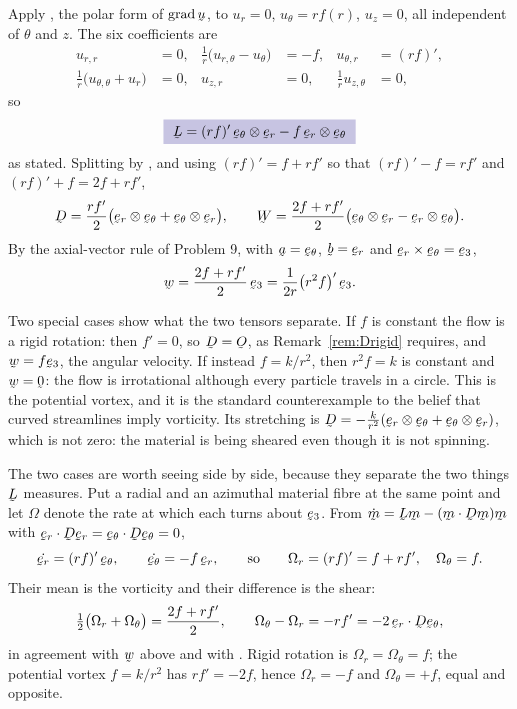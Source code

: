 \begin{solution}
Apply , the polar form of $\grad\bu$, to
$u_{r}=0$, $u_{\theta}=rf(r)$, $u_{z}=0$, all independent of $\theta$ and
$z$. The six coefficients are
\[
\begin{aligned}
   u_{r,r}&=0, &\tfrac1r\big(u_{r,\theta}-u_{\theta}\big)&=-f,
   &u_{\theta,r}&=(rf)',\\
   \tfrac1r\big(u_{\theta,\theta}+u_{r}\big)&=0,
   &u_{z,r}&=0, &\tfrac1r u_{z,\theta}&=0,
\end{aligned}
\]
so
\[
   \boxed{\ \bL=(rf)'\,\bet\otimes\ber-f\,\ber\otimes\bet\ }
\]
as stated. Splitting by , and using $(rf)'=f+rf'$ so that
$(rf)'-f=rf'$ and $(rf)'+f=2f+rf'$,
\[
   \bD=\frac{rf'}{2}\big(\ber\otimes\bet+\bet\otimes\ber\big),
   \qquad
   \bW=\frac{2f+rf'}{2}\big(\bet\otimes\ber-\ber\otimes\bet\big).
\]
By the axial-vector rule of Problem 9, with $\ba=\bet$, $\bb=\ber$ and
$\ber\times\bet=\be_{3}$,
\[
   \bw=\frac{2f+rf'}{2}\,\be_{3}=\frac{1}{2r}\big(r^{2}f\big)'\,\be_{3}.
\]

Two special cases show what the two tensors separate. If $f$ is constant
the flow is a rigid rotation: then $f'=0$, so $\bD=\Ob$, as
Remark~\ref{rem:Drigid} requires, and $\bw=f\be_{3}$, the angular
velocity. If instead $f=k/r^{2}$, then $r^{2}f=k$ is constant and
$\bw=\bze$: the flow is irrotational although every particle travels in a
circle. This is the potential vortex, and it is the standard
counterexample to the belief that curved streamlines imply vorticity.
Its stretching is $\bD=-\tfrac{k}{r^{2}}(\ber\otimes\bet
+\bet\otimes\ber)$, which is not zero: the material is being sheared even
though it is not spinning.

The two cases are worth seeing side by side, because they separate the two
things $\bL$ measures. Put a radial and an azimuthal material fibre at the
same point and let $\Omega$ denote the rate at which each turns about
$\be_{3}$. From $\dot\bm=\bL\bm-(\bm\cdot\bD\bm)\bm$ with
$\ber\cdot\bD\ber=\bet\cdot\bD\bet=0$,
\[
   \dot\ber=(rf)'\,\bet,\qquad \dot\bet=-f\,\ber,
   \qquad\text{so}\qquad
   \Omega_{r}=(rf)'=f+rf',\quad \Omega_{\theta}=f .
\]
Their mean is the vorticity and their difference is the shear:
\[
   \tfrac12\big(\Omega_{r}+\Omega_{\theta}\big)=\frac{2f+rf'}{2},
   \qquad
   \Omega_{\theta}-\Omega_{r}=-rf'=-2\,\ber\cdot\bD\bet ,
\]
in agreement with $\bw$ above and with . Rigid rotation is
$\Omega_{r}=\Omega_{\theta}=f$; the potential vortex $f=k/r^{2}$ has
$rf'=-2f$, hence $\Omega_{r}=-f$ and $\Omega_{\theta}=+f$, equal and
opposite.
\end{solution}

